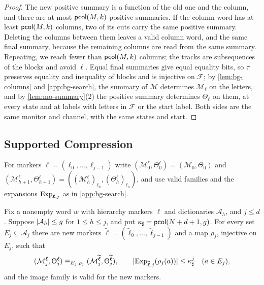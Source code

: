 \begin{proof}
The new positive summary is a function of the old one and the column, and there
are at most $\mathsf{pcol}(M,k)$ positive summaries. If the column word has at least
$\mathsf{pcol}(M,k)$ columns, two of its cuts carry the same positive summary. Deleting
the columns between them leaves a valid column word, and the same final
summary, because the remaining columns are read from the same summary.
Repeating, we reach fewer than $\mathsf{pcol}(M,k)$ columns; the tracks are
subsequences of the blocks and avoid $\ell$. Equal final summaries give equal
equality bits, so $\tau$ preserves equality and inequality of blocks and is
injective on $\mathcal F$; by \cref{lem:bg-columns} and \cref{app:bg-search},
the summary of $\mathcal M$ determines $\mathcal M_\ell$ on the letters, and by
\cref{lem:mo-summary}(2) the positive summary determines $\Theta_\ell$ on them,
at every state and at labels with letters in $\mathcal F$ or the start label.
Both sides are the same monitor and channel, with the same states and start.
\end{proof}

\subsection{Supported Compression}\label{app:mo-compression}

For markers $\boldsymbol\ell=(\ell_0,\ldots,\ell_{j-1})$ write
$(\mathcal M^{\boldsymbol\ell}_0,\Theta^{\boldsymbol\ell}_0)=(\mathcal
M_0,\Theta_0)$ and $(\mathcal M^{\boldsymbol\ell}_{h+1},
\Theta^{\boldsymbol\ell}_{h+1})=((\mathcal M^{\boldsymbol\ell}_h)_{\ell_h},
(\Theta^{\boldsymbol\ell}_h)_{\ell_h})$, and use valid families and the
expansions $\operatorname{Exp}_{\boldsymbol\ell,j}$ as in \cref{app:bg-search}.

\begin{lemma}\label{lem:mo-compression}
Fix a nonempty word $w$ with hierarchy markers $\boldsymbol\ell$ and dictionaries
$\mathcal A_h$, and $j\le d$. Suppose $\lvert \mathcal A_h\rvert\le g$ for $1\le h\le
j$, and put $\kappa_\sharp=\mathsf{pcol}(N+d+1,g)$. For every set $E_j\subseteq
\mathcal A_j$ there are new markers $\widetilde{\boldsymbol\ell}=
(\widetilde\ell_0,\ldots,\widetilde\ell_{j-1})$ and a map $\rho_j$, injective on
$E_j$, such that
\[
 (\mathcal M^{\boldsymbol\ell}_j,\Theta^{\boldsymbol\ell}_j)\equiv_{E_j,\rho_j}
 (\mathcal M^{\widetilde{\boldsymbol\ell}}_j,\Theta^{\widetilde{\boldsymbol\ell}}_j),
 \qquad
 \lvert \operatorname{Exp}_{\widetilde{\boldsymbol\ell},j}(\rho_j(a))\rvert\le\kappa_\sharp^j
 \quad(a\in E_j),
\]
and the image family is valid for the new markers.
\end{lemma}

